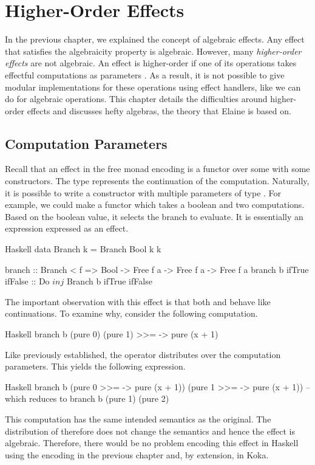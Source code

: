 \chapter{Higher-Order Effects}\label{chap:higher_order}

In the previous chapter, we explained the concept of algebraic effects. Any effect that satisfies the algebraicity property is algebraic. However, many \emph{higher-order effects} are not algebraic. An effect is higher-order if one of its operations takes effectful computations as parameters \autocite{bach_poulsen_hefty_2023}. As a result, it is not possible to give modular implementations for these operations using effect handlers, like we can do for algebraic operations. This chapter details the difficulties around higher-order effects and discusses hefty algebras, the theory that Elaine is based on.

\section{Computation Parameters}

Recall that an effect in the free monad encoding is a functor over some  with some constructors. The type  represents the continuation of the computation. Naturally, it is possible to write a constructor with multiple parameters of type . For example, we could make a  functor which takes a boolean and two computations. Based on the boolean value, it selects the branch to evaluate. It is essentially an  expression expressed as an effect.

\begin{lst}{Haskell}
data Branch k = Branch Bool k k

branch :: Branch < f => Bool -> Free f a -> Free f a -> Free f a
branch b ifTrue ifFalse :: Do $ inj $ Branch b ifTrue ifFalse
\end{lst}
%
The important observation with this effect is that both  and  behave like continuations. To examine why, consider the following computation.

\begin{lst}{Haskell}
branch b (pure 0) (pure 1) >>= \x -> pure (x + 1)
\end{lst}
%
Like previously established, the \hs{>>=} operator distributes over the computation parameters. This yields the following expression.

\begin{lst}{Haskell}
branch b
  (pure 0 >>= \x -> pure (x + 1))
  (pure 1 >>= \x -> pure (x + 1))
-- which reduces to
branch b (pure 1) (pure 2)
\end{lst}
%
This computation has the same intended semantics as the original. The distribution of \hs{>>=} therefore does not change the semantics and hence the effect is algebraic. Therefore, there would be no problem encoding this effect in Haskell using the encoding in the previous chapter and, by extension, in Koka.

